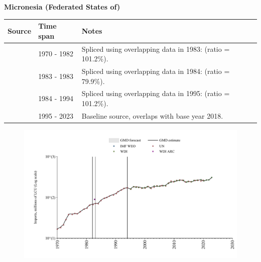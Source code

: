 \documentclass[12pt,a4paper,landscape]{article}
\begin{document}
\begin{adjustbox}{max totalsize={\paperwidth}{\paperheight},center}
\begin{minipage}[t][\textheight][t]{\textwidth}
\vspace*{0.5cm}
{}
\begin{center}
{\Large\bfseries Micronesia (Federated States of)}
\end{center}
\vspace{0.5cm}
\begin{table}[H]
\centering
\small
\begin{tabular}{|l|l|l|}
\hline
\textbf{Source} & \textbf{Time span} & \textbf{Notes} \\
\hline
\rowcolor{white}\cite{UN}& 1970 - 1982 &Spliced using overlapping data in 1983: (ratio = 101.2\%).\\
\rowcolor{lightgray}\cite{WDI}& 1983 - 1983 &Spliced using overlapping data in 1984: (ratio = 79.9\%).\\
\rowcolor{white}\cite{UN}& 1984 - 1994 &Spliced using overlapping data in 1995: (ratio = 101.2\%).\\
\rowcolor{lightgray}\cite{WDI}& 1995 - 2023 &Baseline source, overlaps with base year 2018.\\
\hline
\end{tabular}
\end{table}
\begin{figure}[H]
\centering
\includegraphics[width=\textwidth,height=0.6\textheight,keepaspectratio]{graphs/FSM_imports.pdf}
\end{figure}
\end{minipage}
\end{adjustbox}
\end{document}
